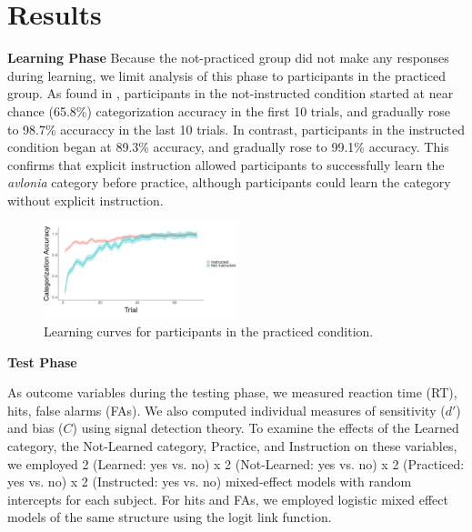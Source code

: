 \documentclass[twocolumn]{svjour3}          %
\begin{document}
\section*{Results}
\label{results}

\noindent\textbf{Learning Phase }
Because the not-practiced group did not make any responses during
learning, we limit analysis of this phase to participants in the
practiced group. As found in \citet{DeBrigard2017}, participants in
the not-instructed condition started at near chance (65.8\%)
categorization accuracy in the first 10 trials, and gradually rose to
98.7\% accuraccy in the last 10 trials. In contrast, participants in
the instructed condition began at 89.3\% accuracy, and gradually rose
to 99.1\% accuracy. This confirms that explicit instruction allowed
participants to successfully learn the \emph{avlonia} category before
practice, although participants could learn the category without
explicit instruction.

\begin{figure}
  \includegraphics[width=0.5\textwidth]{learning.png}
  \caption{Learning curves for participants in the practiced
    condition.}
  \label{fig:learning}
\end{figure}

\noindent\textbf{Test Phase }

As outcome variables during the testing phase, we measured reaction
time (RT), hits, false alarms (FAs). We also computed individual
measures of sensitivity ($d'$) and bias ($C$) using signal detection
theory. To examine the effects of the Learned category, the
Not-Learned category, Practice, and Instruction on these variables, we
employed 2 (Learned: yes vs. no) x 2 (Not-Learned: yes vs. no) x 2
(Practiced: yes vs. no) x 2 (Instructed: yes vs. no) mixed-effect
models with random intercepts for each subject. For hits and FAs, we
employed logistic mixed effect models of the same structure using the
logit link function.
\end{document}
